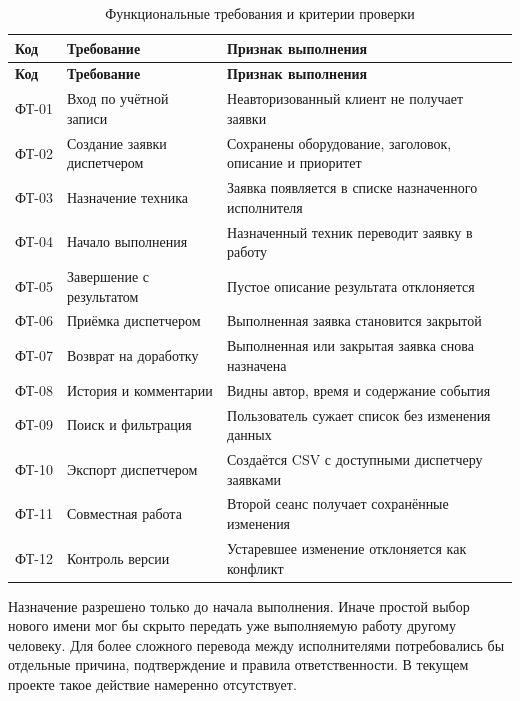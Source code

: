 \documentclass{timcw}
\renewcommand{\arraystretch}{1.18}
\begin{document}
\begingroup\small\singlespacing
\renewcommand{\arraystretch}{1.11}
\begin{longtable}{>{\raggedright\arraybackslash}p{}>{\raggedright\arraybackslash}p{}>{\raggedright\arraybackslash}p{}}
\caption{Функциональные требования и критерии проверки}\\
\hline
\textbf{Код} & \textbf{Требование} & \textbf{Признак выполнения} \\ \hline
\endfirsthead
\textbf{Код} & \textbf{Требование} & \textbf{Признак выполнения} \\ \hline
\endhead
ФТ-01 & Вход по учётной записи & Неавторизованный клиент не получает заявки \\ \hline
ФТ-02 & Создание заявки диспетчером & Сохранены оборудование, заголовок, описание и приоритет \\ \hline
ФТ-03 & Назначение техника & Заявка появляется в списке назначенного исполнителя \\ \hline
ФТ-04 & Начало выполнения & Назначенный техник переводит заявку в работу \\ \hline
ФТ-05 & Завершение с результатом & Пустое описание результата отклоняется \\ \hline
ФТ-06 & Приёмка диспетчером & Выполненная заявка становится закрытой \\ \hline
ФТ-07 & Возврат на доработку & Выполненная или закрытая заявка снова назначена \\ \hline
ФТ-08 & История и комментарии & Видны автор, время и содержание события \\ \hline
ФТ-09 & Поиск и фильтрация & Пользователь сужает список без изменения данных \\ \hline
ФТ-10 & Экспорт диспетчером & Создаётся CSV с доступными диспетчеру заявками \\ \hline
ФТ-11 & Совместная работа & Второй сеанс получает сохранённые изменения \\ \hline
ФТ-12 & Контроль версии & Устаревшее изменение отклоняется как конфликт \\ \hline
\end{longtable}
\endgroup

Назначение разрешено только до начала выполнения. Иначе простой выбор нового имени мог бы скрыто передать уже выполняемую работу другому человеку. Для более сложного перевода между исполнителями потребовались бы отдельные причина, подтверждение и правила ответственности. В текущем проекте такое действие намеренно отсутствует.
\end{document}
